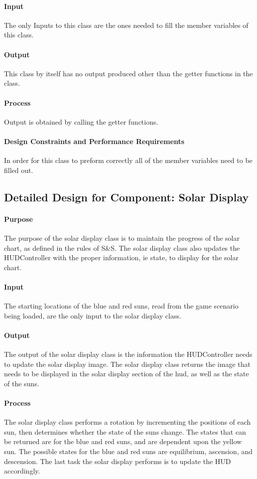 \documentclass[12pt,a4paper,titlepage]{article}
\begin{document}
\paragraph{Input} The only Inputs to this class are the ones needed to fill the member variables of this class.
\paragraph{Output} This class by itself has no output produced other than the getter functions in the class.
\paragraph{Process} Output is obtained by calling the getter functions. 
\paragraph{Design Constraints and Performance Requirements} In order for this class to preform correctly all of the member variables need to be filled out.

\subsection{Detailed Design for Component: Solar Display}
\paragraph{Purpose} The purpose of the solar display class is to maintain the progress of the solar chart, as defined in the rules of S\&S. The solar display class also updates the HUDController with the proper information, ie state, to display for the solar chart.
\paragraph{Input} The starting locations of the blue and red suns, read from the game scenario being loaded, are the only input to the solar display class.
\paragraph{Output} The output of the solar display class is the information the HUDController needs to update the solar display image. The solar display class returns the image that needs to be displayed in the solar display section of the hud, as well as the state of the suns.
\paragraph{Process} The solar display class performs a rotation by incrementing the positions of each sun, then determines whether the state of the suns change. The states that can be returned are for the blue and red suns, and are dependent upon the yellow sun. The possible states for the blue and red suns are equilibrium, ascension, and descension. The last task the solar display performs is to update the HUD accordingly. 
\end{document}
